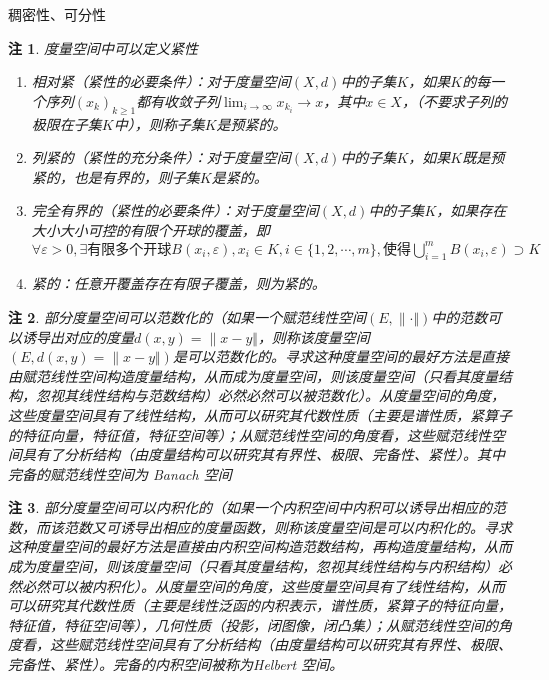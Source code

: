 \documentclass{article}                     %
\numberwithin{equation}{section}            %
\numberwithin{figure}{section}              %
\numberwithin{table}{section}               %
\newtheorem{remark}{\indent 注}[section]
\begin{document}
稠密性、可分性
\begin{remark}
    度量空间中可以定义紧性
    \begin{enumerate}
        \item 相对紧（紧性的必要条件）：对于度量空间$(X,d)$中的子集$K$，如果$K$的每一个序列$(x_k)_{k\ge 1}$都有收敛子列$\lim_{i\to\infty}x_{k_i}\to x$，其中$x\in X$，（不要求子列的极限在子集$K$中），则称子集$K$是预紧的。
        \item 列紧的（紧性的充分条件）：对于度量空间$(X,d)$中的子集$K$，如果$K$既是预紧的，也是有界的，则子集$K$是紧的。
        \item 完全有界的（紧性的必要条件）：对于度量空间$(X,d)$中的子集$K$，如果存在大小大小可控的有限个开球的覆盖，即$\forall \varepsilon >0,\exists \mbox{有限多个开球}B(x_i,\varepsilon ),x_i\in K,i\in\{1,2,\cdots,m\},\mbox{使得}\bigcup _{i=1}^{m}B(x_i,\varepsilon )\supset K$
        \item 紧的：任意开覆盖存在有限子覆盖，则为紧的。
    \end{enumerate}
\end{remark}
\begin{remark}
    部分度量空间可以范数化的（如果一个赋范线性空间$(E,\| \cdot\Vert )$中的范数可以诱导出对应的度量$d(x,y)=\| x-y\Vert $，则称该度量空间$(E,d(x,y)=\| x-y\Vert )$是可以范数化的。寻求这种度量空间的最好方法是直接由赋范线性空间构造度量结构，从而成为度量空间，则该度量空间（只看其度量结构，忽视其线性结构与范数结构）必然必然可以被范数化）。从度量空间的角度，这些度量空间具有了线性结构，从而可以研究其代数性质（主要是谱性质，紧算子的特征向量，特征值，特征空间等）；从赋范线性空间的角度看，这些赋范线性空间具有了分析结构（由度量结构可以研究其有界性、极限、完备性、紧性）。其中完备的赋范线性空间为 Banach 空间
\end{remark}
\begin{remark}
    部分度量空间可以内积化的（如果一个内积空间中内积可以诱导出相应的范数，而该范数又可诱导出相应的度量函数，则称该度量空间是可以内积化的。寻求这种度量空间的最好方法是直接由内积空间构造范数结构，再构造度量结构，从而成为度量空间，则该度量空间（只看其度量结构，忽视其线性结构与内积结构）必然必然可以被内积化）。从度量空间的角度，这些度量空间具有了线性结构，从而可以研究其代数性质（主要是线性泛函的内积表示，谱性质，紧算子的特征向量，特征值，特征空间等），几何性质（投影，闭图像，闭凸集）；从赋范线性空间的角度看，这些赋范线性空间具有了分析结构（由度量结构可以研究其有界性、极限、完备性、紧性）。完备的内积空间被称为Helbert 空间。
\end{remark}
\end{document}
